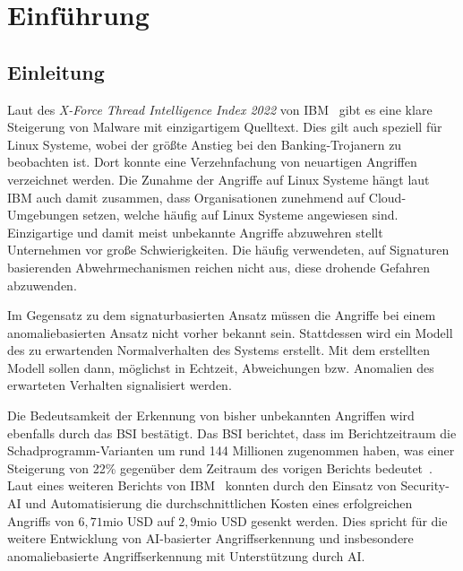 \chapter{Einführung}\label{ch:introduction} %
\section{Einleitung}\label{sec:einleitung}
Laut des \textit{X-Force Thread Intelligence Index 2022} von IBM~\cite{IBM} gibt es eine klare Steigerung von Malware mit einzigartigem Quelltext.
Dies gilt auch speziell für Linux Systeme, wobei der größte Anstieg bei den Banking-Trojanern zu beobachten ist.
Dort konnte eine Verzehnfachung von neuartigen Angriffen verzeichnet werden.
Die Zunahme der Angriffe auf Linux Systeme hängt laut IBM auch damit zusammen, dass Organisationen zunehmend auf Cloud-Umgebungen setzen, welche häufig auf Linux Systeme angewiesen sind.
Einzigartige und damit meist unbekannte Angriffe abzuwehren stellt Unternehmen vor große Schwierigkeiten.
Die häufig verwendeten, auf Signaturen basierenden Abwehrmechanismen reichen nicht aus, diese drohende Gefahren abzuwenden.\par \medskip
Im Gegensatz zu dem signaturbasierten Ansatz müssen die Angriffe bei einem anomaliebasierten Ansatz nicht vorher bekannt sein.
Stattdessen wird ein Modell des zu erwartenden Normalverhalten des Systems erstellt.
Mit dem erstellten Modell sollen dann, möglichst in Echtzeit, Abweichungen bzw. Anomalien des erwarteten Verhalten signalisiert werden.\par \medskip
Die Bedeutsamkeit der Erkennung von bisher unbekannten Angriffen wird ebenfalls durch das \ac{BSI} bestätigt.
Das \ac{BSI} berichtet, dass im Berichtzeitraum die Schadprogramm-Varianten um rund 144 Millionen zugenommen haben, was einer Steigerung von 22\% gegenüber dem Zeitraum des vorigen Berichts bedeutet~\cite{BSI}.
Laut eines weiteren Berichts von IBM~\cite{IBM2} konnten durch den Einsatz von Security-\ac{AI} und Automatisierung die durchschnittlichen Kosten eines erfolgreichen Angriffs von $6,71$mio USD auf $2,9$mio USD gesenkt werden.
Dies spricht für die weitere Entwicklung von \ac{AI}-basierter Angriffserkennung und insbesondere anomaliebasierte Angriffserkennung mit Unterstützung durch \ac{AI}.\par\medskip

